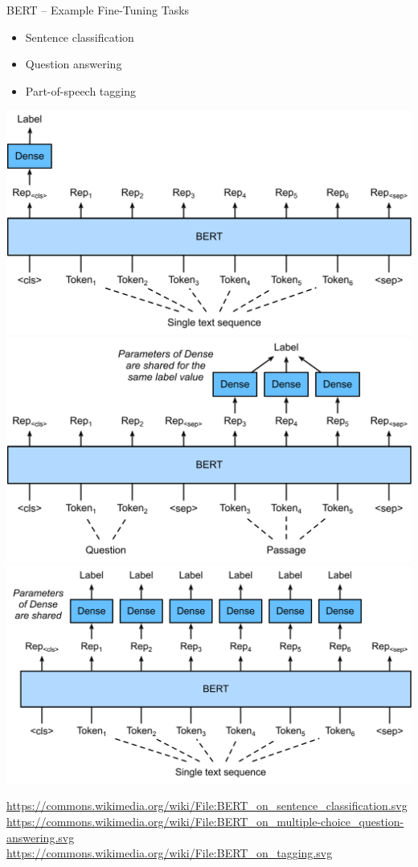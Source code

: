 \documentclass[ignorenonframetext,xcolor=x11names]{beamer}
\begin{document}
\begin{frame}{BERT -- Example Fine-Tuning Tasks}
\begin{itemize}
   \item Sentence classification
   \item Question answering
   \item Part-of-speech tagging
\end{itemize}

\begin{center}
\includegraphics[width=.45\textwidth]{BERT_on_sentence_classification.svg.png} \hspace{.05\textwidth}
\includegraphics[width=.45\textwidth]{BERT_on_multiple-choice_question-answering.svg.png}
\includegraphics[width=.45\textwidth]{BERT_on_tagging.svg.png}
\end{center}

\tiny
\url{https://commons.wikimedia.org/wiki/File:BERT_on_sentence_classification.svg} \\
\url{https://commons.wikimedia.org/wiki/File:BERT_on_multiple-choice_question-answering.svg} \\
\url{https://commons.wikimedia.org/wiki/File:BERT_on_tagging.svg}

\end{frame}
\end{document}
